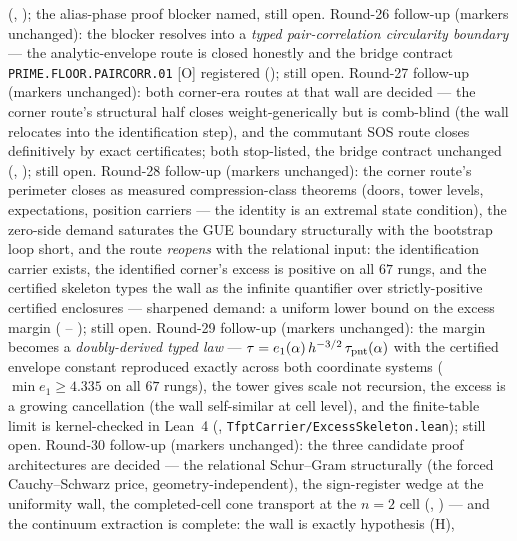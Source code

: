 \documentclass[11pt,a4paper]{article}
\theoremstyle{definition}
\begin{document}
(,
); the alias-phase proof
blocker named, still open.  Round-26 follow-up (markers
unchanged): the blocker resolves into a \emph{typed
pair-correlation circularity boundary} --- the analytic-envelope
route is closed honestly and the bridge contract
\texttt{PRIME.FLOOR.PAIRCORR.01} [O] registered
(); still open.
Round-27 follow-up (markers unchanged): both corner-era routes at
that wall are decided --- the corner route's structural half
closes weight-generically but is comb-blind (the wall relocates
into the identification step), and the commutant SOS route closes
definitively by exact certificates; both stop-listed, the bridge
contract unchanged
(,
); still open.
Round-28 follow-up (markers unchanged): the corner route's
perimeter closes as measured compression-class theorems (doors,
tower levels, expectations, position carriers --- the identity is
an extremal state condition), the zero-side demand saturates the
GUE boundary structurally with the bootstrap loop short, and the
route \emph{reopens} with the relational input: the
identification carrier exists, the identified corner's excess is
positive on all $67$ rungs, and the certified skeleton types the
wall as the infinite quantifier over strictly-positive certified
enclosures --- sharpened demand: a uniform lower bound on the
excess margin
( --
); still open.
Round-29 follow-up (markers unchanged): the margin becomes a
\emph{doubly-derived typed law} ---
$\tau = e_1(\alpha)\, h^{-3/2}\, \tau_{\rm pnt}(\alpha)$ with the
certified envelope constant reproduced exactly across both
coordinate systems ($\min e_1 \ge 4.335$ on all $67$ rungs), the
tower gives scale not recursion, the excess is a growing
cancellation (the wall self-similar at cell level), and the
finite-table limit is kernel-checked in Lean~4
(,
\texttt{TfptCarrier/ExcessSkeleton.lean}); still open.
Round-30 follow-up (markers unchanged): the three candidate
proof architectures are decided --- the relational Schur--Gram
structurally (the forced Cauchy--Schwarz price,
geometry-independent), the sign-register wedge at the uniformity
wall, the completed-cell cone transport at the $n = 2$ cell
(,
) --- and the continuum
extraction is complete: the wall is exactly hypothesis (H),
\end{document}
